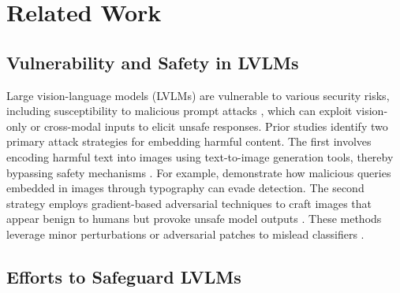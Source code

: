 \section{Related Work}
\subsection{Vulnerability and Safety in LVLMs}
Large vision-language models (LVLMs) are vulnerable to various security risks, including susceptibility to malicious prompt attacks \cite{liu2024safety}, which can exploit vision-only \cite{liu2023query} or cross-modal \cite{luo2024jailbreakv} inputs to elicit unsafe responses. Prior studies identify two primary attack strategies for embedding harmful content. The first involves encoding harmful text into images using text-to-image generation tools, thereby bypassing safety mechanisms \cite{gong2023figstep,liu2023query,luo2024jailbreakv}. For example, \citet{gong2023figstep} demonstrate how malicious queries embedded in images through typography can evade detection. The second strategy employs gradient-based adversarial techniques to craft images that appear benign to humans but provoke unsafe model outputs \cite{zhao2024evaluating,shayegani2023plug,dong2023robust,qi2023visual,tu2023many,luo2024an,wan-etal-2024-logicasker}. These methods leverage minor perturbations or adversarial patches to mislead classifiers \cite{bagdasaryan2023ab,schlarmann2023adversarial,bailey2023image,fu2023misusing}.



\subsection{Efforts to Safeguard LVLMs}

